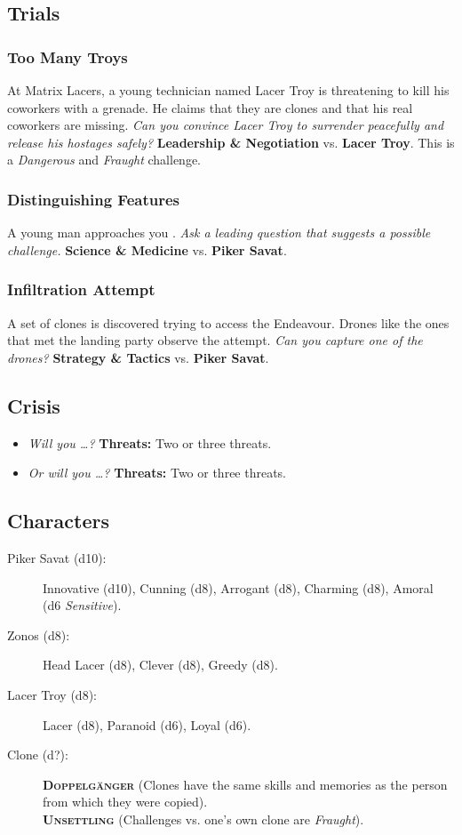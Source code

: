 \documentclass[11pt, a5paper, parskip=half-, DIV=12]{scrartcl}
\begin{document}
\subsection*{Trials}
\subsubsection*{Too Many Troys}
At Matrix Lacers, a young technician named Lacer Troy is threatening to kill his coworkers with a grenade. He claims that they are clones and that his real coworkers are missing. \textit{Can you convince Lacer Troy to surrender peacefully and release his hostages safely?} \textbf{Leadership \& Negotiation} vs. \textbf{Lacer Troy}. This is a \textit{Dangerous} and \textit{Fraught} challenge.

\subsubsection*{Distinguishing Features}
A young man approaches you . \textit{Ask a leading question that suggests a possible challenge.} \textbf{Science \& Medicine} vs. \textbf{Piker Savat}.

\subsubsection*{Infiltration Attempt}
A set of clones is discovered trying to access the Endeavour. Drones like the ones that met the landing party observe the attempt. \textit{Can you capture one of the drones?} \textbf{Strategy \& Tactics} vs. \textbf{Piker Savat}.

\subsection*{Crisis}

\begin{itemize}
	\item \textit{Will you \ldots?} \textbf{Threats:} Two or three threats.
	\item \textit{Or will you \ldots?} \textbf{Threats:} Two or three threats.
\end{itemize}

\newpage

\subsection*{Characters}
\begin{description}
	\item[Piker Savat (d10):] Innovative (d10), Cunning (d8), Arrogant (d8), Charming (d8), Amoral (d6 \textit{Sensitive}).
	\item[Zonos (d8):] Head Lacer (d8), Clever (d8), Greedy (d8).%
	\item[Lacer Troy (d8):] Lacer (d8), Paranoid (d6), Loyal (d6).
	\item[Clone (d?):] \textbf{\textsc{Doppelg\"anger}} (Clones have the same skills and memories as the person from which they were copied).\\ \textbf{\textsc{Unsettling}} (Challenges vs. one's own clone are \textit{Fraught}).
\end{description}
\end{document}

